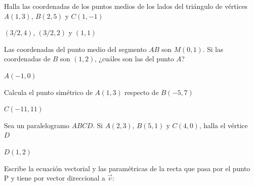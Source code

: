 \documentclass[spanish, 11pt]{exam}
\begin{document}
\begin{questions}
\question Halla las coordenadas de los puntos medios de los lados del
triángulo de vértices $A(1,3)$, $B(2,5)$ y $C(1,-1)$
\begin{solution} $(3/2,4)$, $(3/2,2)$ y $(1,1)$ \end{solution}

\question Las coordenadas del punto medio del segmento $AB$ son $M(0,1)$. Si las coordenadas de $B$ son $(1,2)$, ¿cuáles son las del punto $A$?
\begin{solution} $A(-1,0)$ \end{solution}

\question Calcula el punto simétrico de $A(1,3)$ respecto de $B(-5,7)$ 
\begin{solution} $C(-11,11)$ \end{solution}

\question Sea un paralelogramo $ABCD$. Si $A(2,3)$, $B(5,1)$ y $C(4,0)$, halla
el vértice $D$
\begin{solution} $D(1,2)$ \end{solution}

\question Escribe la ecuación vectorial y las paramétricas de la recta que pasa por el punto P y tiene por vector direccional a $\overrightarrow{v}$:
\begin{multicols}{2}
\end{multicols}


\end{questions}
\end{document}
